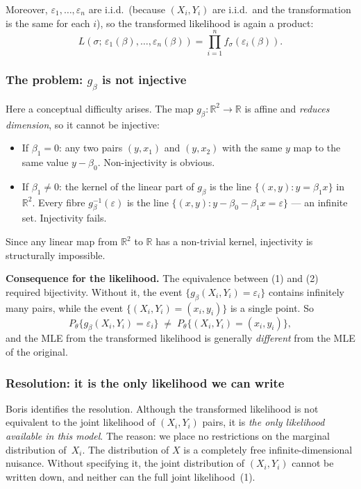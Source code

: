 \documentclass[a4paper,oneside,12pt]{extarticle}
\theoremstyle{plain}
\theoremstyle{definition}
\theoremstyle{remark}
\begin{document}
Moreover, $\varepsilon_1,\ldots,\varepsilon_n$ are i.i.d.\ (because
$(X_i,Y_i)$ are i.i.d.\ and the transformation is the same for
each $i$), so the transformed likelihood is again a product:
\[
  L(\sigma;\,\varepsilon_1(\beta),\ldots,\varepsilon_n(\beta))
  = \prod_{i=1}^n f_\sigma(\varepsilon_i(\beta)).
\]

\subsubsection*{The problem: $g_\beta$ is not injective}

Here a conceptual difficulty arises.  The map
$g_\beta : \mathbb{R}^2 \to \mathbb{R}$ is affine and
\emph{reduces dimension}, so it cannot be injective:

\begin{itemize}
\item If $\beta_1 = 0$: any two pairs $(y, x_1)$ and $(y, x_2)$
  with the same $y$ map to the same value $y - \beta_0$.
  Non-injectivity is obvious.
\item If $\beta_1 \neq 0$: the kernel of the linear part of $g_\beta$
  is the line $\{(x,y) : y = \beta_1 x\}$ in $\mathbb{R}^2$.
  Every fibre $g_\beta^{-1}(\varepsilon)$ is the line
  $\{(x,y) : y - \beta_0 - \beta_1 x = \varepsilon\}$ --- an
  infinite set.  Injectivity fails.
\end{itemize}

Since any linear map from $\mathbb{R}^2$ to $\mathbb{R}$ has a
non-trivial kernel, injectivity is structurally impossible.

\textbf{Consequence for the likelihood.}
The equivalence between (1) and (2) required bijectivity.  Without
it, the event $\{g_\beta(X_i,Y_i) = \varepsilon_i\}$ contains
infinitely many pairs, while the event
$\{(X_i,Y_i) = (x_i,y_i)\}$ is a single point.  So
\[
  P_\theta\{g_\beta(X_i,Y_i) = \varepsilon_i\}
  \;\neq\;
  P_\theta\{(X_i,Y_i) = (x_i,y_i)\},
\]
and the MLE from the transformed likelihood is generally
\emph{different} from the MLE of the original.

\subsubsection*{Resolution: it is the only likelihood we can write}

Boris identifies the resolution.  Although the transformed
likelihood is not equivalent to the joint likelihood of $(X_i,Y_i)$
pairs, it is \emph{the only likelihood available in this model}.
The reason: we place no restrictions on the marginal distribution
of~$X_i$.  The distribution of $X$ is a completely free
infinite-dimensional nuisance.  Without specifying it, the joint
distribution of $(X_i,Y_i)$ cannot be written down, and neither can
the full joint likelihood~(1).
\end{document}
